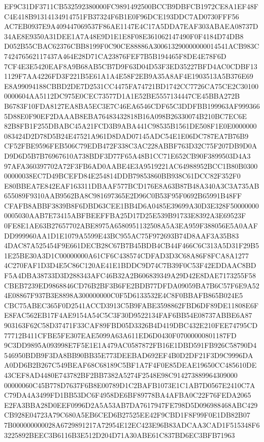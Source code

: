 \documentclass[UTF8,fontset=fandol,zihao=-4,a4paper]{ctexart}
\begin{document}
{{EF9C31DF3711CB532592380000FC9891492500BCCB9DBFCB1972CE8A1EF48FC4E418B91314134914751FB37324F6B1E0F96DCE193DDC7AD0730FFF56
AC7EB0937E9A409447069537F86AE1147E4C17A5DDA7EAF303ABAEA08737D34AE8E9350A31DEE1A7A48E9D1E1E8F08E361062147490F0F4184D74DB8
D052B55CBAC62376CBB8199F0C90CE88886A300613290000000014541ACB983C742476562117437A464E28D71CA23876FEF7B5B194465F8DE4E78F6D
7CF4E3E5420EAF8A9B68AB5CB7D9F63D04D53F3ED35227BFD4AC0CDBF131129F7AA4226FD3F221B5E61A1A4E58F2EB9A35A8AF4E1903513A5B376E69
E8A99094188CBBD2DE7D2531CC4475FA74721BD1742CC7726CA75CE2C301000000604AA5112DC975E0CEC73577D1A1E52BE5557134447CE45BBA272B
B6783F10FDA8127EA8BA5EC3E7C46EA6546CDF65C3DDFBB199963AF9993665D88E0F90EF2DAAAB8EBA76483432818B16A098B26330074B210BC7EC6E
82B8FB1F255DBABC45A21FCD3B9ABA441C98535B1561DE508F1E0E0000000083424D2D78D5B24E47521A961D8DAD07145ADC54E1E06DC787EA7B76B9
CF52FBE9596FEB506C79EDB472F338C3AC228ABBF763D32C75F207DB9D0AD9D6D5B7B76967610A738BDF3D77F65A48B1CC71E652CB90F3899503D4A3
97AFA360397702A72F3FB6AD0AABE4E3A9519221AC64988952BCC1B80B030000000038EC7D49BCEFD84E254814DDB79853860BB938C61DCC82F352F0
E80BBEA7E842EAF163311DBAAF577BCD176E8A63B87B48A340A3C3A735AB655089F9310AAB9562BA8C981697365E2D96C0B53F95F0692B65991B48FF
CFAFB8ABBF3839B8F6DBD63CEE1BB4D6A0485E39699A30D3E328F500000000005030AAB7E73415ABFBEEFFBA25D17D25E539B91733E8392A3E69523F
0FE8E1AE63B27657702ABE8975A6580951132508A5A3EA959F388056E5A0AAFDD999960AA1D1E1079A5599E43BC955AC75F972693B74D8AAF3A35B83
4DAC87A525454F9E661DECB28C67B7B45BDB4CB44F466C6C313A5D31F29B51E25BE30A3D1C00000000A61CF6C438574CDFAD3D3C68A86F8FCA8A1277
4C270FAF1D3D4E5C86C120AE41E1BDDC9D74C7B39F0C53F42EDDAAC8BDF5A4DBA38733D3D288343AFC46B32A2B606839349A29D42E8DAE7173255F58
CBEB7239ED9868846CD76B2BF3B6FE2BDB77DFDA09059BA7B6C57F6E9A524E08867F937B3E8898A300000000C0F5D6133532E4C8F0BBAFB865B024E5
CBC75ABEC365F0D2541ACCD3913C5B9FABE3598862FBD6DF89DE11808E6FE8FAC562EB17F4AE9154A54C5C3F30D9522134FAF6BB54E08737ABBE6A87
903163F62C58D37471F33CAF89FBD05D3326B4D419DBC432E210FEE74795CD77712B411CFBE5FE307EAE5099A63A611ED6D0430F07000000801187FD
9C3DD9895A093998E7F5E1E1A479AC0587872FB16E1DBD591FB926C58790D4546950BDB9F3DA8BB90BB35E773DEEBAD692EF4B0D2DF21F3D9C9996DA
A0DD6B2B267C549BEAF68C68189C5BF1A7F4F0E85DEAE19650CC485610DE43CEF8AD4480E743782BF2BB7382A5274F2548E98C914273889964309000
00000060C45B778D7637F6B8E00789D1C2BAFB1073E1C1AB7D0567E2410C7AC79DA4A3499FD1BB53DC6F4958DE6BF89778BA4AFBA0C22F76FEDA2065
E2FA3BBA28D0EEF0996D2A5A53AB7DA7617947FE798D5D096988468ABC429CB928E04723A79C680A5EB6CED6B27525EE42F9CBD1F8F99F0E1DB82B07
7B000000000028A6729891217A72954E12EC423E96B83ADCAA3CAD1F515348F63225892BEEC3B6116B3E512D204D71A30ABE61C837BD6EC3BFB71963
}}
\end{document}
